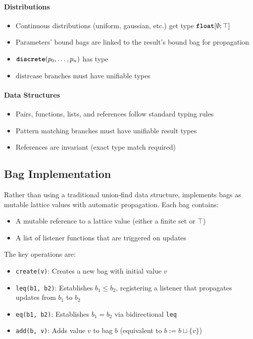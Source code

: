 \paragraph{Distributions}
\begin{itemize}
    \item Continuous distributions (uniform, gaussian, etc.) get type $\text{\ttfamily\bfseries float}[\emptyset; \top]$
    \item Parameters' bound bags are linked to the result's bound bag for propagation
    \item $\text{\ttfamily\bfseries discrete}(p_0, \ldots, p_n)$ has type \intty{}
    \item $\text{distrcase}$ branches must have unifiable types
\end{itemize}

\paragraph{Data Structures}
\begin{itemize}
    \item Pairs, functions, lists, and references follow standard typing rules
    \item Pattern matching branches must have unifiable result types
    \item References are invariant (exact type match required)
\end{itemize}

\subsection{Bag Implementation}

Rather than using a traditional union-find data structure, \Slice{} implements bags as mutable lattice values with automatic propagation. Each bag contains:
\begin{itemize}
    \item A mutable reference to a lattice value (either a finite set or $\top$)
    \item A list of listener functions that are triggered on updates
\end{itemize}

The key operations are:
\begin{itemize}
    \item \texttt{create(v)}: Creates a new bag with initial value $v$
    \item \texttt{leq(b1, b2)}: Establishes $b_1 \leq b_2$, registering a listener that propagates updates from $b_1$ to $b_2$
    \item \texttt{eq(b1, b2)}: Establishes $b_1 = b_2$ via bidirectional \texttt{leq}
    \item \texttt{add(b, v)}: Adds value $v$ to bag $b$ (equivalent to $b := b \sqcup \{v\}$)
\end{itemize}

